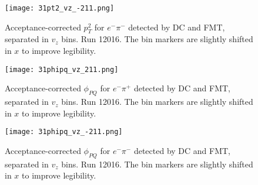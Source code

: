     \begin{figure}
        \centering
        \texttt{[image: 31pt2\_vz\_-211.png]}
        \caption[Acceptance-corrected $p_T^2$ for $e^-\pi^-$ separated in $v_z$ bins]
        {Acceptance-corrected $p_T^2$ for $e^-\pi^-$ detected by DC and FMT, separated in $v_z$ bins.
        Run 12016.
        The bin markers are slightly shifted in $x$ to improve legibility.}
        \label{fig::14.31::pt2_-211_vz}
    \end{figure}

    \begin{figure}
        \centering
        \texttt{[image: 31phipq\_vz\_211.png]}
        \caption[Acceptance-corrected $\phi_{PQ}$ for $e^-\pi^+$ separated in $v_z$ bins]
        {Acceptance-corrected $\phi_{PQ}$ for $e^-\pi^+$ detected by DC and FMT, separated in $v_z$ bins.
        Run 12016.
        The bin markers are slightly shifted in $x$ to improve legibility.}
        \label{fig::14.31::phipq_211_vz}
    \end{figure}

    \begin{figure}
        \centering
        \texttt{[image: 31phipq\_vz\_-211.png]}
        \caption[Acceptance-corrected $\phi_{PQ}$ for $e^-\pi^-$ separated in $v_z$ bins]
        {Acceptance-corrected $\phi_{PQ}$ for $e^-\pi^-$ detected by DC and FMT, separated in $v_z$ bins.
        Run 12016.
        The bin markers are slightly shifted in $x$ to improve legibility.}
        \label{fig::14.31::phipq_-211_vz}
    \end{figure}
